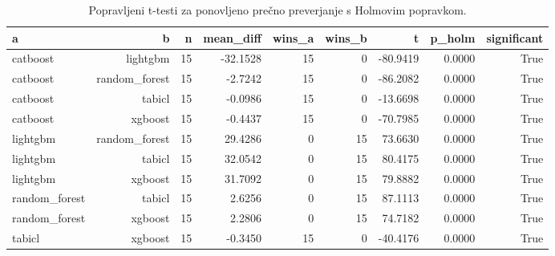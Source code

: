\begin{table}[htbp]
\centering
\caption{Popravljeni t-testi za ponovljeno prečno preverjanje s Holmovim popravkom.}
\label{tab:corrected-ttest}
\begin{tabular}{lrrrrrrrr}
\hline
a & b & n & mean\_diff & wins\_a & wins\_b & t & p\_holm & significant \\
\hline
catboost & lightgbm & 15 & -32.1528 & 15 & 0 & -80.9419 & 0.0000 & True \\
catboost & random\_forest & 15 & -2.7242 & 15 & 0 & -86.2082 & 0.0000 & True \\
catboost & tabicl & 15 & -0.0986 & 15 & 0 & -13.6698 & 0.0000 & True \\
catboost & xgboost & 15 & -0.4437 & 15 & 0 & -70.7985 & 0.0000 & True \\
lightgbm & random\_forest & 15 & 29.4286 & 0 & 15 & 73.6630 & 0.0000 & True \\
lightgbm & tabicl & 15 & 32.0542 & 0 & 15 & 80.4175 & 0.0000 & True \\
lightgbm & xgboost & 15 & 31.7092 & 0 & 15 & 79.8882 & 0.0000 & True \\
random\_forest & tabicl & 15 & 2.6256 & 0 & 15 & 87.1113 & 0.0000 & True \\
random\_forest & xgboost & 15 & 2.2806 & 0 & 15 & 74.7182 & 0.0000 & True \\
tabicl & xgboost & 15 & -0.3450 & 15 & 0 & -40.4176 & 0.0000 & True \\
\hline
\end{tabular}
\end{table}
